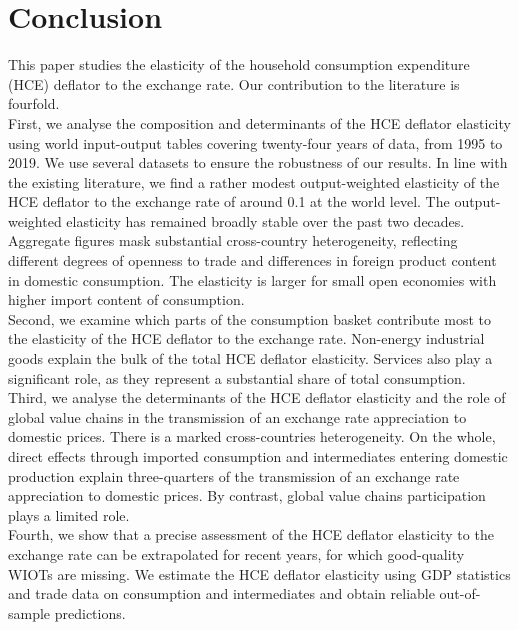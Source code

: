 \documentclass[11pt,a4paper]{paper} %
\begin{document}
%

\section{Conclusion}
\label{sec:ccl}
This paper studies the elasticity of the household consumption expenditure (HCE) deflator to the exchange rate.
Our contribution to the literature is fourfold. \\
First, we analyse the composition and determinants of the HCE deflator elasticity using world input-output tables covering twenty-four years of data, from 1995 to 2019. 
We use several datasets to ensure the robustness of our results.
In line with the existing literature, we find a rather modest output-weighted elasticity of the HCE deflator to the exchange rate of around 0.1 at the world level.
The output-weighted elasticity has remained broadly stable over the past two decades.
Aggregate figures mask substantial cross-country heterogeneity, reflecting different degrees of openness to trade and differences in foreign product content in domestic consumption. 
The elasticity is larger for small open economies with higher import content of consumption. \\
Second, we examine which parts of the consumption basket contribute most to the elasticity of the HCE deflator to the exchange rate. 
Non-energy industrial goods explain the bulk of the total HCE deflator elasticity. 
Services also play a significant role, as they represent a substantial share of total consumption. \\
Third, we analyse the determinants of the HCE deflator elasticity and the role of global value chains in the transmission of an exchange rate appreciation to domestic prices.
There is a marked cross-countries heterogeneity.
On the whole, direct effects through imported consumption and intermediates entering domestic production explain three-quarters of the transmission of an exchange rate appreciation to domestic prices.
By contrast, global value chains participation plays a limited role. \\
Fourth, we show that a precise assessment of the HCE deflator elasticity to the exchange rate can be extrapolated for recent years, for which good-quality WIOTs are missing.
We estimate the HCE deflator elasticity using GDP statistics and trade data on consumption and intermediates and obtain reliable out-of-sample predictions.
\end{document}
